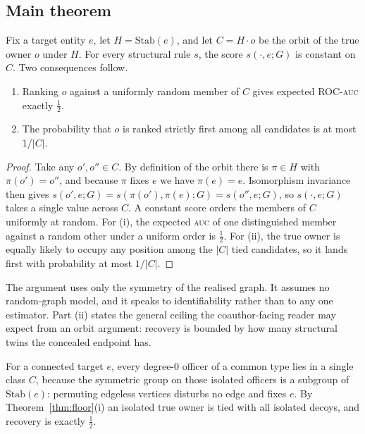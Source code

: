 \documentclass[sigconf]{acmart}
\begin{document}
\subsection{Main theorem}
\begin{theorem}\label{thm:floor}
Fix a target entity $e$, let $H=\mathrm{Stab}(e)$, and let $C=H\!\cdot\!o$ be the
orbit of the true owner $o$ under $H$. For every structural rule $s$, the score
$s(\cdot,e;G)$ is constant on $C$. Two consequences follow.
\begin{enumerate}
\item[(i)] Ranking $o$ against a uniformly random member of $C$ gives expected
ROC-\textsc{auc} exactly $\tfrac12$.
\item[(ii)] The probability that $o$ is ranked strictly first among all
candidates is at most $1/|C|$.
\end{enumerate}
\end{theorem}
\begin{proof}
Take any $o',o''\in C$. By definition of the orbit there is $\pi\in H$ with
$\pi(o')=o''$, and because $\pi$ fixes $e$ we have $\pi(e)=e$. Isomorphism
invariance then gives $s(o',e;G)=s(\pi(o'),\pi(e);G)=s(o'',e;G)$, so $s(\cdot,e;G)$
takes a single value across $C$. A constant score orders the members of $C$
uniformly at random. For (i), the expected \textsc{auc} of one distinguished
member against a random other under a uniform order is $\tfrac12$. For (ii), the
true owner is equally likely to occupy any position among the $|C|$ tied
candidates, so it lands first with probability at most $1/|C|$.
\end{proof}

The argument uses only the symmetry of the realised graph. It assumes no
random-graph model, and it speaks to identifiability rather than to any one
estimator. Part (ii) states the general ceiling the coauthor-facing reader may
expect from an orbit argument: recovery is bounded by how many structural twins
the concealed endpoint has.

\begin{corollary}\label{cor:iso}
For a connected target $e$, every degree-$0$ officer of a common type lies in a
single class $C$, because the symmetric group on those isolated officers is a
subgroup of $\mathrm{Stab}(e)$: permuting edgeless vertices disturbs no edge and
fixes $e$. By Theorem~\ref{thm:floor}(i) an isolated true owner is tied with all
isolated decoys, and recovery is exactly $\tfrac12$.
\end{corollary}
\end{document}
